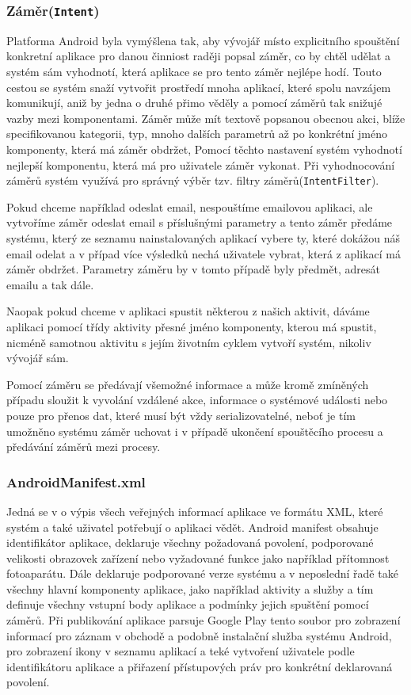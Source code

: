 \documentclass{article}
\begin{document}
\subsubsection{Záměr(\texttt{Intent})}
Platforma Android byla vymýšlena tak, aby vývojář místo explicitního spouštění konkretní aplikace pro danou činniost
raději popsal záměr, co by chtěl udělat a systém sám vyhodnotí, která aplikace se pro tento záměr nejlépe
hodí. Touto cestou se systém snaží vytvořit prostředí mnoha aplikací, které spolu navzájem komunikují,
aniž by jedna o druhé přimo věděly a pomocí záměrů tak snižujé vazby mezi komponentami. Záměr může mít
textově popsanou obecnou akci, blíže specifikovanou kategorii, typ, mnoho dalších parametrů až po konkrétní
jméno komponenty, která má záměr obdržet, Pomocí těchto nastavení systém vyhodnotí nejlepší komponentu,
která má pro uživatele záměr vykonat. Při vyhodnocování záměrů systém využívá pro správný výběr
 tzv. filtry záměrů(\texttt{IntentFilter}).

Pokud chceme například odeslat email, nespouštíme emailovou aplikaci, ale vytvoříme záměr odeslat email
s příslušnými parametry a tento záměr předáme systému, který ze seznamu nainstalovaných aplikací vybere
ty, které dokážou náš email odelat a v případ více výsledků nechá uživatele vybrat, která z aplikací
má záměr obdržet. Parametry záměru by v tomto případě byly předmět, adresát emailu a tak dále.

Naopak pokud chceme v aplikaci spustit některou z našich aktivit, dáváme aplikaci pomocí třídy
aktivity přesné jméno komponenty, kterou má spustit, nicméně samotnou aktivitu s jejím životním
cyklem vytvoří systém, nikoliv vývojář sám.

Pomocí záměru se předávají všemožné informace a může kromě zmíněných případu sloužit k vyvolání
vzdálené akce, informace o systémové události nebo pouze pro přenos dat, které musí být vždy
serializovatelné, neboť je tím umožněno systému záměr uchovat i v případě ukončení spouštěcího
procesu a předávání záměrů mezi procesy.

\subsubsection{AndroidManifest.xml}
Jedná se v o výpis všech veřejných informací aplikace ve formátu XML, které systém
a také uživatel potřebují o aplikaci vědět. Android manifest obsahuje identifikátor aplikace, deklaruje všechny
požadovaná povolení, podporované velikosti obrazovek zařízení nebo vyžadované funkce jako například přítomnost
fotoaparátu. Dále deklaruje podporované verze systému a v neposlední řadě také všechny hlavní komponenty
aplikace, jako například aktivity a služby a tím definuje všechny vstupní body aplikace a podmínky
jejich spuštění pomocí záměrů. Při publikování aplikace
parsuje Google Play tento soubor pro zobrazení informací pro záznam v obchodě a podobně instalační služba
systému Android, pro zobrazení ikony v seznamu aplikací a teké vytvoření uživatele podle identifikátoru
aplikace a přiřazení přístupových práv pro konkrétní deklarovaná povolení.
\end{document}
